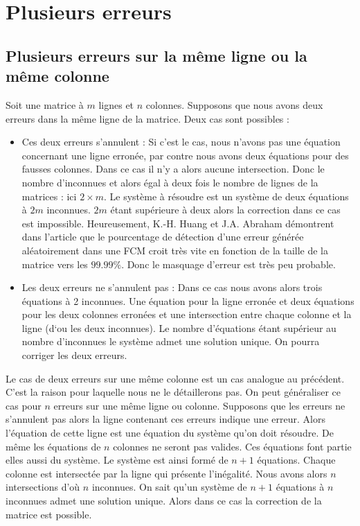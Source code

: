 \documentclass[a4paper, 10pt]{report}
\begin{document}
\section{Plusieurs erreurs}
\subsection{Plusieurs erreurs sur la même ligne ou la même colonne}
Soit une matrice à $m$ lignes et $n$ colonnes. Supposons que nous avons deux erreurs dans la même ligne de la matrice. 
Deux cas sont possibles :
\begin{itemize}
 \item Ces deux erreurs s’annulent : Si c’est le cas, nous n’avons pas une équation concernant une ligne erronée, par 
       contre nous avons deux équations pour des fausses colonnes. Dans ce cas il n’y a alors aucune intersection. 
       Donc le nombre d’inconnues et alors égal à deux fois le nombre de lignes de la matrices : ici $2 \times m$.
       \newline
       Le système à résoudre est un système de deux équations à $2m$ inconnues. $2m$ étant supérieure à deux alors 
       la correction dans ce cas est impossible.\newline
       Heureusement, K.-H. Huang et J.A. Abraham démontrent dans l'article que le pourcentage de détection d'une erreur 
       générée  aléatoirement dans une FCM croit très vite en fonction de la taille de la matrice vers les $99.99\%$. 
       Donc le masquage d'erreur est très peu probable.  
 \item Les deux erreurs ne s’annulent pas : Dans ce cas nous avons alors trois équations à 2 inconnues. Une équation 
       pour la ligne erronée et deux équations pour les deux colonnes erronées et une intersection entre chaque colonne 
       et la ligne (d‘ou les deux inconnues). Le nombre d’équations étant supérieur au nombre d’inconnues le système admet 
       une solution unique. On pourra corriger les deux erreurs.
\end{itemize}
Le cas de deux erreurs sur une même colonne est un cas analogue au précédent. C’est la raison pour laquelle nous ne 
le détaillerons pas.\newline
On peut généraliser ce cas pour $n$ erreurs sur une même ligne ou colonne. Supposons que les erreurs ne s’annulent pas 
alors la ligne contenant ces erreurs indique une erreur. Alors l’équation de cette ligne est une équation du système 
qu’on doit résoudre. De même les équations de $n$ colonnes ne seront pas valides. Ces équations font partie elles aussi 
du système. Le système est ainsi formé de $n+1$ équations. Chaque colonne est intersectée par la ligne qui présente l’inégalité. 
Nous avons alors $n$ intersections d’où $n$ inconnues.\newline
On sait qu'un système de $n+1$ équations à $n$ inconnues admet une solution unique. Alors dans ce cas la correction de 
la matrice est possible.
\end{document}
